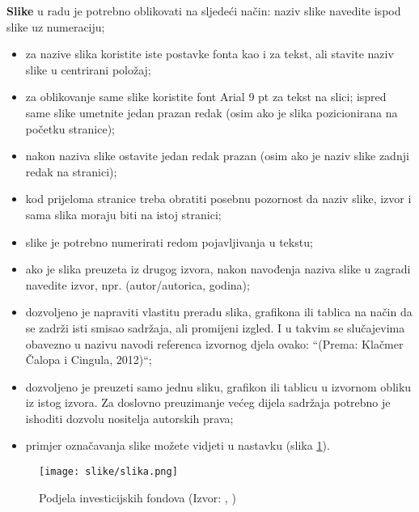 \begin{flushleft}\textbf{Slike} u radu je potrebno oblikovati na sljedeći način:
naziv slike navedite ispod slike uz numeraciju;\end{flushleft}

\begin{itemize}
    \item za nazive slika koristite iste postavke fonta kao i za tekst, ali stavite naziv slike u centrirani položaj;

    \item za oblikovanje same slike koristite font Arial 9 pt za tekst na slici;
    ispred same slike umetnite jedan prazan redak (osim ako je slika pozicionirana na početku stranice);

    \item nakon naziva slike ostavite jedan redak prazan (osim ako je naziv slike zadnji redak na stranici);

    \item kod prijeloma stranice treba obratiti posebnu pozornost da naziv slike, izvor i sama slika moraju biti na istoj stranici;

    \item slike je potrebno numerirati redom pojavljivanja u tekstu;

    \item ako je slika preuzeta iz drugog izvora, nakon navođenja naziva slike u zagradi navedite izvor, npr. (autor/autorica, godina);

    \item dozvoljeno je napraviti vlastitu preradu slika, grafikona ili tablica na način da se zadrži isti smisao sadržaja, ali promijeni izgled. I u takvim se slučajevima obavezno u nazivu navodi referenca izvornog djela ovako: “(Prema: Klačmer Čalopa i Cingula, 2012)“;

    \item dozvoljeno je preuzeti samo jednu sliku, grafikon ili tablicu u izvornom obliku iz istog izvora. Za doslovno preuzimanje većeg dijela sadržaja potrebno je ishoditi dozvolu nositelja autorskih prava;

    \item primjer označavanja slike možete vidjeti u nastavku (slika \ref{fig:podjela}).
\end{itemize}

\begin{figure}[h!]
    \centering
    \texttt{[image: slike/slika.png]}
    \caption{Podjela investicijskih fondova (Izvor: \citeauthor{Aranda2009}, \citeyear{Aranda2009})}
    \label{fig:podjela}
\end{figure}

